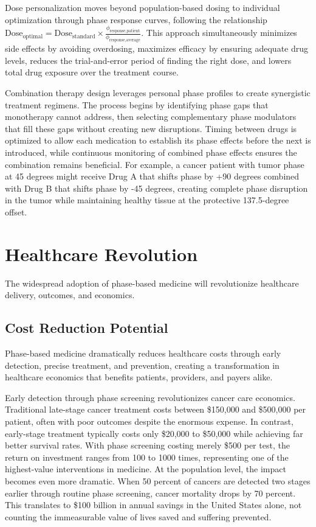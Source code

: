 \documentclass[12pt,a4paper]{report}
\begin{document}
Dose personalization moves beyond population-based dosing to individual optimization through phase response curves, following the relationship $\text{Dose}_{\text{optimal}} = \text{Dose}_{\text{standard}} \times \frac{\phi_{\text{response,patient}}}{\phi_{\text{response,average}}}$. This approach simultaneously minimizes side effects by avoiding overdosing, maximizes efficacy by ensuring adequate drug levels, reduces the trial-and-error period of finding the right dose, and lowers total drug exposure over the treatment course.

Combination therapy design leverages personal phase profiles to create synergistic treatment regimens. The process begins by identifying phase gaps that monotherapy cannot address, then selecting complementary phase modulators that fill these gaps without creating new disruptions. Timing between drugs is optimized to allow each medication to establish its phase effects before the next is introduced, while continuous monitoring of combined phase effects ensures the combination remains beneficial. For example, a cancer patient with tumor phase at 45 degrees might receive Drug A that shifts phase by +90 degrees combined with Drug B that shifts phase by -45 degrees, creating complete phase disruption in the tumor while maintaining healthy tissue at the protective 137.5-degree offset.

\section{Healthcare Revolution}

The widespread adoption of phase-based medicine will revolutionize healthcare delivery, outcomes, and economics.

\subsection{Cost Reduction Potential}

Phase-based medicine dramatically reduces healthcare costs through early detection, precise treatment, and prevention, creating a transformation in healthcare economics that benefits patients, providers, and payers alike.

Early detection through phase screening revolutionizes cancer care economics. Traditional late-stage cancer treatment costs between \$150,000 and \$500,000 per patient, often with poor outcomes despite the enormous expense. In contrast, early-stage treatment typically costs only \$20,000 to \$50,000 while achieving far better survival rates. With phase screening costing merely \$500 per test, the return on investment ranges from 100 to 1000 times, representing one of the highest-value interventions in medicine. At the population level, the impact becomes even more dramatic. When 50 percent of cancers are detected two stages earlier through routine phase screening, cancer mortality drops by 70 percent. This translates to \$100 billion in annual savings in the United States alone, not counting the immeasurable value of lives saved and suffering prevented.
\end{document}
